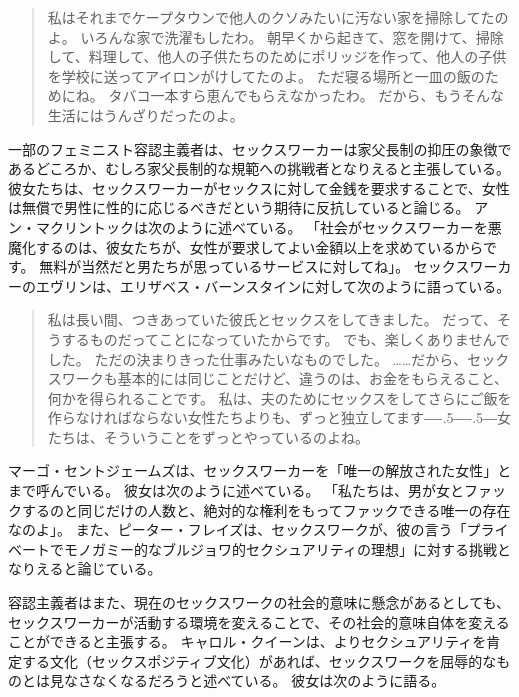\documentclass[paper=a4,book,openany]{jlreq}
\newcommand{\ig}[1]{}           %
\def\DDASH{―\kern-.5\zw―\kern-.5\zw―}
\begin{document}
\begin{quote}
私はそれまでケープタウンで他人のクソみたいに汚ない家を掃除してたのよ。
いろんな家で洗濯もしたわ。
朝早くから起きて、窓を開けて、掃除して、料理して、他人の子供たちのためにポリッジを作って、他人の子供を学校に送ってアイロンがけしてたのよ。
ただ寝る場所と一皿の飯のためにね。
タバコ一本すら恵んでもらえなかったわ。
だから、もうそんな生活にはうんざりだったのよ。
\citep[p.49]{mac18:_revol_prost}
\end{quote}

一部のフェミニスト容認主義者は、セックスワーカーは家父長制の抑圧の象徴であるどころか、むしろ家父長制的な規範への挑戦者となりえると主張している。
彼女たちは、セックスワーカーがセックスに対して金銭を要求することで、女性は無償で男性に性的に応じるべきだという期待に反抗していると論じる。
アン・マクリントックは次のように述べている。
「社会がセックスワーカーを悪魔化するのは、彼女たちが、女性が要求してよい金額以上を求めているからです。
無料が当然だと男たちが思っているサービスに対してね」\citep[p.1]{mcclintock93:_sex_worker_sex_work}。
セックスワーカーのエヴリンは、エリザベス・バーンスタインに対して次のように語っている。

\begin{quote}
私は長い間、つきあっていた彼氏とセックスをしてきました。
だって、そうするものだってことになっていたからです。
でも、楽しくありませんでした。
ただの決まりきった仕事みたいなものでした。
……だから、セックスワークも基本的には同じことだけど、違うのは、お金をもらえること、何かを得られることです。
私は、夫のためにセックスをしてさらにご飯を作らなければならない女性たちよりも、ずっと独立してます{\DDASH}女たちは、そういうことをずっとやっているのよね。
\citep[p.106]{bernstein99:_whats_wrong_prost}\ig{Elizabeth Bernstein}
\end{quote}

マーゴ・セントジェームズは、セックスワーカーを「唯一の解放された女性」とまで呼んでいる。
彼女は次のように述べている。
「私たちは、男が女とファックするのと同じだけの人数と、絶対的な権利をもってファックできる唯一の存在なのよ」\citep[p.84]{james87:_reclam_whores}。
また、ピーター・フレイズは、セックスワークが、彼の言う「プライベートでモノガミー的なブルジョワ的セクシュアリティの理想」に対する挑戦となりえると論じている\citep{frase12:_probl_sex_work}。

容認主義者はまた、現在のセックスワークの社会的意味に懸念があるとしても、セックスワーカーが活動する環境を変えることで、その社会的意味自体を変えることができると主張する。
キャロル・クイーンは、よりセクシュアリティを肯定する文化（セックスポジティブ文化）があれば、セックスワークを屈辱的なものとは見なさなくなるだろうと述べている。
彼女は次のように語る。
\end{document}
